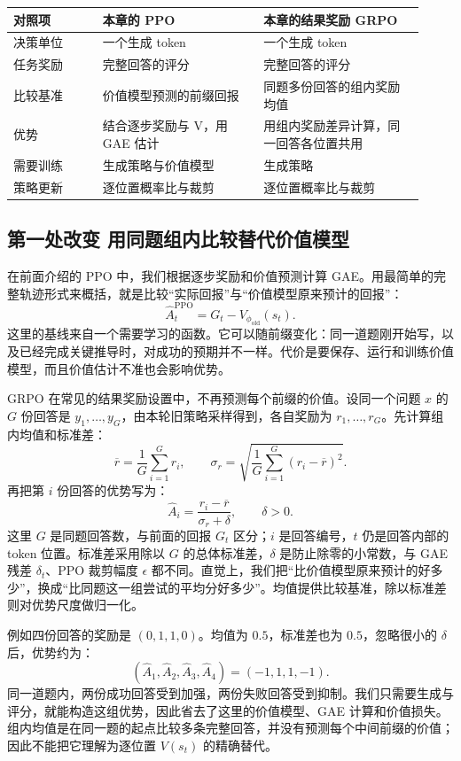 \begin{center}
\begin{tabular}{@{}p{0.20\linewidth}p{0.36\linewidth}p{0.36\linewidth}@{}}
\toprule
对照项 & 本章的 PPO & 本章的结果奖励 GRPO \\
\midrule
决策单位 & 一个生成 token & 一个生成 token \\
任务奖励 & 完整回答的评分 & 完整回答的评分 \\
比较基准 & 价值模型预测的前缀回报 & 同题多份回答的组内奖励均值 \\
优势 & 结合逐步奖励与 V，用 GAE 估计 & 用组内奖励差异计算，同一回答各位置共用 \\
需要训练 & 生成策略与价值模型 & 生成策略 \\
策略更新 & 逐位置概率比与裁剪 & 逐位置概率比与裁剪 \\
\bottomrule
\end{tabular}
\end{center}

\subsection{第一处改变 用同题组内比较替代价值模型}

在前面介绍的 PPO 中，我们根据逐步奖励和价值预测计算 GAE。用最简单的完整轨迹形式来概括，就是比较``实际回报''与``价值模型原来预计的回报''：
\[
    \widehat A_t^{\mathrm{PPO}}=G_t-V_{\phi_{\mathrm{old}}}(s_t).
\]
这里的基线来自一个需要学习的函数。它可以随前缀变化：同一道题刚开始写，以及已经完成关键推导时，对成功的预期并不一样。代价是要保存、运行和训练价值模型，而且价值估计不准也会影响优势。

GRPO 在常见的结果奖励设置中，不再预测每个前缀的价值。设同一个问题 $x$ 的 $G$ 份回答是 $y_1,\ldots,y_G$，由本轮旧策略采样得到，各自奖励为 $r_1,\ldots,r_G$。先计算组内均值和标准差：
\[
    \overline r=\frac1G\sum_{i=1}^{G}r_i,
    \qquad
    \sigma_r=\sqrt{\frac1G\sum_{i=1}^{G}(r_i-\overline r)^2}.
\]
再把第 $i$ 份回答的优势写为：
\[
    \widehat A_i=\frac{r_i-\overline r}{\sigma_r+\delta},
    \qquad \delta>0.
\]
这里 $G$ 是同题回答数，与前面的回报 $G_t$ 区分；$i$ 是回答编号，$t$ 仍是回答内部的 token 位置。标准差采用除以 $G$ 的总体标准差，$\delta$ 是防止除零的小常数，与 GAE 残差 $\delta_t$、PPO 裁剪幅度 $\epsilon$ 都不同。直觉上，我们把``比价值模型原来预计的好多少''，换成``比同题这一组尝试的平均分好多少''。均值提供比较基准，除以标准差则对优势尺度做归一化。

例如四份回答的奖励是 $(0,1,1,0)$。均值为 $0.5$，标准差也为 $0.5$，忽略很小的 $\delta$ 后，优势约为：
\[
    (\widehat A_1,\widehat A_2,\widehat A_3,\widehat A_4)
      =(-1,1,1,-1).
\]
同一道题内，两份成功回答受到加强，两份失败回答受到抑制。我们只需要生成与评分，就能构造这组优势，因此省去了这里的价值模型、GAE 计算和价值损失。组内均值是在同一题的起点比较多条完整回答，并没有预测每个中间前缀的价值；因此不能把它理解为逐位置 $V(s_t)$ 的精确替代。

